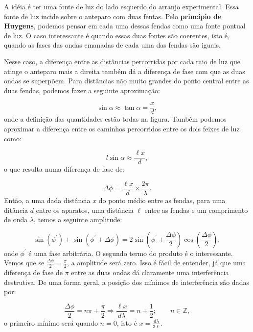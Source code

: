 \documentclass{article}
\begin{document}
A id\'eia \'e ter uma fonte de luz do lado esquerdo do arranjo experimental. Essa fonte de luz incide sobre o anteparo com duas fentas. Pelo \textbf{princ\'ipio de Huygens}, podemos pensar em cada uma dessas fendas como uma fonte pontual de luz. O caso interessante \'e quando essas duas fontes s\~ao coerentes, isto \'e, quando as fases das ondas emanadas de cada uma das fendas s\~ao iguais.

Nesse caso, a diferen\c ca entre as dist\^ancias percorridas por cada raio de luz que atinge o anteparo mais a direita tamb\'em d\'a a diferen\c ca de fase com que as duas ondas se superp\~oem. Para dist\^ancias n\~ao muito grandes do ponto central entre as duas fendas, podemos fazer a seguinte aproxima\c c\~ao:

\begin{equation}
\sin\alpha \approx \tan\alpha = \frac{x}{d},
\end{equation}
onde a defini\c c\~ao das quantidades est\~ao todas na figura. Tamb\'em podemos aproximar a diferen\c ca entre os caminhos percorridos entre os dois feixes de luz como:

\begin{equation}
l\sin\alpha\approx \frac{\ell x}{d},
\end{equation}
o que resulta numa diferen\c ca de fase de:

\begin{equation}
\Delta\phi = \frac{\ell x}{d}\times\frac{2\pi}{\lambda}.
\end{equation}
Ent\~ao, a uma dada dist\^ancia $x$ do ponto m\'edio entre as fendas, para uma dit\^ancia $d$ entre os aparatos, uma dist\^ancia $\ell$ entre as fendas e um comprimento de onda $\lambda$, temos a seguinte amplitude:

\begin{equation}
\sin(\phi^{\prime}) + \sin(\phi^{\prime} + \Delta\phi) = 2\sin(\phi^{\prime} + \frac{\Delta\phi}{2})\cos(\frac{\Delta\phi}{2}),
\end{equation}
onde $\phi^{\prime}$ \'e uma fase arbitr\'aria. O segundo termo do produto \'e o interessante. Vemos que se $\frac{\Delta\phi}{2} = \frac{\pi}{2}$, a amplitude ser\'a zero. Isso \'e f\'acil de entender, j\'a que uma diferen\c ca de fase de $\pi$ entre as duas ondas d\'a claramente uma interfer\^encia destrutiva. De uma forma geral, a posi\c c\~ao dos m\'inimos de interfer\^encia s\~ao dadas por:

\begin{equation}
\frac{\Delta\phi}{2} = n\pi + \frac{\pi}{2} \Rightarrow \frac{\ell x}{d\lambda} = n + \frac{1}{2}; \qquad n\in\mathbb{Z},
\end{equation}
o primeiro m\'inimo ser\'a quando $n=0$, isto \'e $x = \frac{d\lambda}{2\ell}$.
\end{document}
